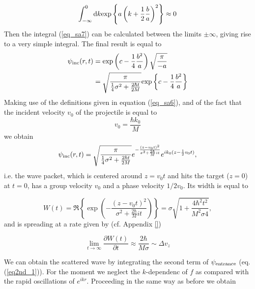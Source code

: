 \begin{equation}\label{eq_sa7}
\int_{-\infty}^0 {\rm d}k {\rm exp} \left\{ a \left( k + \frac{1}{2} \frac{b}{a} \right)^2 \right\} \approx 0
\end{equation}
Then the integral (\ref{eq_sa7}) can be calculated between the limits $\pm \infty$, giving rise to a very simple integral. The final result is equal to
\begin{equation}
\begin{split}
\psi_{\rm inc}(r,t) &= {\rm exp}\left( c - \frac{1}{4} \frac{b^2}{a} \right) \sqrt{\frac{\pi}{-a}} \\
&= \sqrt{\frac{\pi}{\frac{1}{4} \sigma^2 + \frac{2 \hbar t}{2M}}} {\rm exp} \left\{ c - \frac{1}{4} \frac{b^2}{a} \right\}
\end{split}
\end{equation}
Making use of the definitions given in equation (\ref{eq_sa6}), and of the fact that the incident velocity $v_0$ of the projectile is equal to
\begin{equation}
v_0 = \frac{\hbar k_0}{M}
\end{equation}
we obtain
\begin{equation}\label{eq_sa8}
\psi_{\rm inc}(r,t) = \sqrt{\frac{\pi}{\frac{1}{4} \sigma^2 + \frac{2 \hbar t}{2M}}} e^{- \frac{(z-v_0 t)^2}{\sigma^2 + \frac{2 \hbar}{M} i t}} e^{ik_0 (z - \frac{1}{2} v_0 t)},
\end{equation}
i.e. the wave packet, which is centered around $z=v_0 t$ and hits the target ($z=0$) at $t=0$, has a group velocity $v_0$ and a phase velocity $1/2 v_0$. Its width is equal to

\begin{equation}
W(t) = \Re \left\{ \exp \left(- \frac{(z-v_0 t)^2}{\sigma^2 + \frac{2 \hbar}{M} i t}\right) \right\} = \sigma \sqrt{1+ \frac{4 \hbar^2 t^2}{M^2 \sigma 4}},
\end{equation}
and is spreading at a rate given by (cf. Appendix \ref{})

\begin{equation}
\lim_{t \rightarrow \infty} \frac{\partial W(t)}{\partial t} \approx \frac{2 \hbar}{M \sigma} \sim \Delta v_z
\end{equation}

 We can obtain the scattered wave by integrating the second term of $\psi_{\rm entrance}$  (eq. (\ref{eq2nd_1})). For the moment we neglect the $k$-dependenc of $f$ as compared with the rapid oscillations of $e^{ikr}$. Proceeding in the same way as before we obtain

